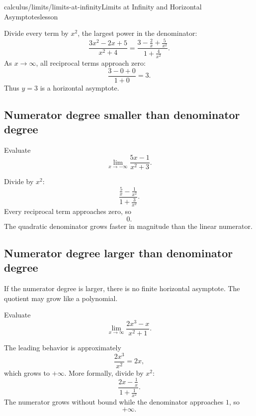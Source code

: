 \begin{webpage}{calculus/limits/limits-at-infinity}{Limits at Infinity and Horizontal Asymptotes}{lesson}
\begin{bgexample}[title={Divide by the largest denominator power}]
\begin{bgsolution}
Divide every term by \(x^2\), the largest power in the denominator:
\[
\frac{3x^2-2x+5}{x^2+4}
=\frac{3-\frac2x+\frac5{x^2}}{1+\frac4{x^2}}.
\]
As \(x\to\infty\), all reciprocal terms approach zero:
\[
  \frac{3-0+0}{1+0}=\boxed{3}.
\]
Thus \(y=3\) is a horizontal asymptote.
\end{bgsolution}


\end{bgexample}

\subsection{Numerator degree smaller than denominator degree}

\begin{bgexample}[title={The denominator wins}]
Evaluate
\[
  \lim_{x\to-\infty}\frac{5x-1}{x^2+3}.
\]

\begin{bgsolution}
Divide by \(x^2\):
\[
  \frac{\frac5x-\frac1{x^2}}{1+\frac3{x^2}}.
\]
Every reciprocal term approaches zero, so
\[
  \boxed{0}.
\]
The quadratic denominator grows faster in magnitude than the linear numerator.
\end{bgsolution}
\end{bgexample}

\subsection{Numerator degree larger than denominator degree}

If the numerator degree is larger, there is no finite horizontal asymptote. The quotient may grow like a polynomial.

\begin{bgexample}[title={Unbounded end behavior}]
Evaluate
\[
  \lim_{x\to\infty}\frac{2x^3-x}{x^2+1}.
\]

\begin{bgsolution}
The leading behavior is approximately
\[
  \frac{2x^3}{x^2}=2x,
\]
which grows to \(+\infty\). More formally, divide by \(x^2\):
\[
  \frac{2x-\frac1x}{1+\frac1{x^2}}.
\]
The numerator grows without bound while the denominator approaches \(1\), so
\[
  \boxed{+\infty}.
\]
\end{bgsolution}
\end{bgexample}


\end{webpage}
